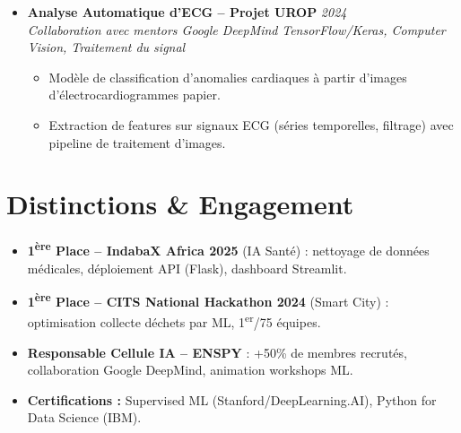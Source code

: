 \documentclass[a4paper,11pt]{article}
\begin{document}
\begin{itemize}[leftmargin=*, label={-}]
\item \textbf{Analyse Automatique d'ECG -- Projet UROP} \hfill \textit{2024} \\
\textit{Collaboration avec mentors Google DeepMind} \hfill \textit{TensorFlow/Keras, Computer Vision, Traitement du signal}
\vspace{-2pt}
    \begin{itemize}[leftmargin=0.4cm, nosep, label=\tiny$\bullet$]
        \item \small{Modèle de classification d'anomalies cardiaques à partir d'images d'électrocardiogrammes papier.}
        \item \small{Extraction de features sur signaux ECG (séries temporelles, filtrage) avec pipeline de traitement d'images.}
    \end{itemize}
\vspace{3pt}

\end{itemize}

\section{Distinctions \& Engagement}
\begin{itemize}[leftmargin=*, nosep, label=\tiny$\bullet$]
    \item \small{\textbf{1\textsuperscript{ère} Place -- IndabaX Africa 2025} (IA Santé) : nettoyage de données médicales, déploiement API (Flask), dashboard Streamlit.}
    \item \small{\textbf{1\textsuperscript{ère} Place -- CITS National Hackathon 2024} (Smart City) : optimisation collecte déchets par ML, 1\textsuperscript{er}/75 équipes.}
    \item \small{\textbf{Responsable Cellule IA -- ENSPY} : +50\% de membres recrutés, collaboration Google DeepMind, animation workshops ML.}
    \item \small{\textbf{Certifications :} Supervised ML (Stanford/DeepLearning.AI), Python for Data Science (IBM).}
\end{itemize}
\end{document}

